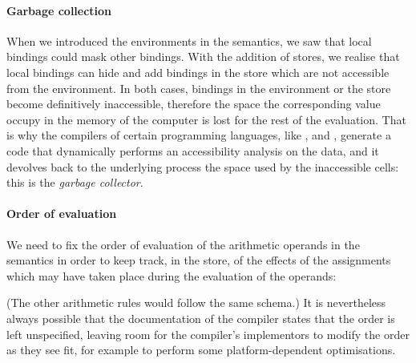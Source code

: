 \paragraph{Garbage collection}

When we introduced the environments in the semantics, we saw that
local bindings could mask other bindings. With the addition of stores,
we realise that local bindings can hide and add bindings in the store
which are not accessible from the environment. In both cases, bindings
in the environment or the store become definitively inaccessible,
therefore the space the corresponding value occupy in the memory of
the computer is lost for the rest of the evaluation. That is why the
compilers of certain programming languages, like \OCaml, \Java
and \Ada, generate a code that dynamically performs an accessibility
analysis on the data, and it devolves back to the underlying process
the space used by the inaccessible cells: this is the \emph{garbage
collector}.

\paragraph{Order of evaluation}

We need to fix the order of evaluation of the arithmetic operands in
the semantics in order to keep track, in the store, of the effects of
the assignments which may have taken place during the evaluation of
the operands:
(The other arithmetic rules would follow the same schema.) It is
nevertheless always possible that the documentation of the compiler
states that the order is left unspecified, leaving room for the
compiler's implementors to modify the order as they see fit, for
example to perform some platform\hyp{}dependent optimisations.

